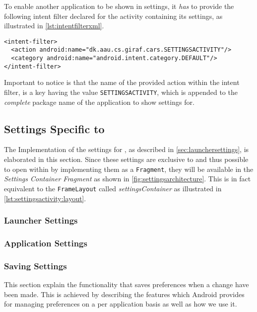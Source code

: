 To enable another \giraf application to be shown in settings, it \textit{has} to provide the following intent filter declared for the activity containing its settings, as illustrated in \cref{lst:intentfilterxml}.

\begin{lstlisting}[caption={The intent filter and action a \giraf application has to provide to be shown in settings.}, label={lst:intentfilterxml}]
<intent-filter>
  <action android:name="dk.aau.cs.giraf.cars.SETTINGSACTIVITY"/>
  <category android:name="android.intent.category.DEFAULT"/>
</intent-filter>
\end{lstlisting}

Important to notice is that the name of the provided action within the intent filter, is a key having the value \lstinline|SETTINGSACTIVITY|, which is appended to the \textit{complete} package name of the application to show settings for.

\subsection{Settings Specific to \launcher}
The Implementation of the settings for \launcher, as described in \cref{sec:launchersettings}, is elaborated in this section.
Since these settings are exclusive to \launcher and thus possible to open within \settingsactivity by implementing them as a \lstinline|Fragment|, they will be available in the \textit{Settings Container Fragment} as shown in \cref{fig:settingsarchitecture}.
This is in fact equivalent to the \lstinline|FrameLayout| called \textit{settingsContainer} as illustrated in \cref{lst:settingsactivity:layout}.


\subsubsection{Launcher Settings}


\subsubsection{Application Settings}


\subsubsection{Saving Settings}\label{para:sprint4:managingsettingsandroid}
This section explain the functionality that saves preferences when a change have been made. This is achieved by describing the features which Android provides for managing preferences on a per application basis as well as how we use it.

